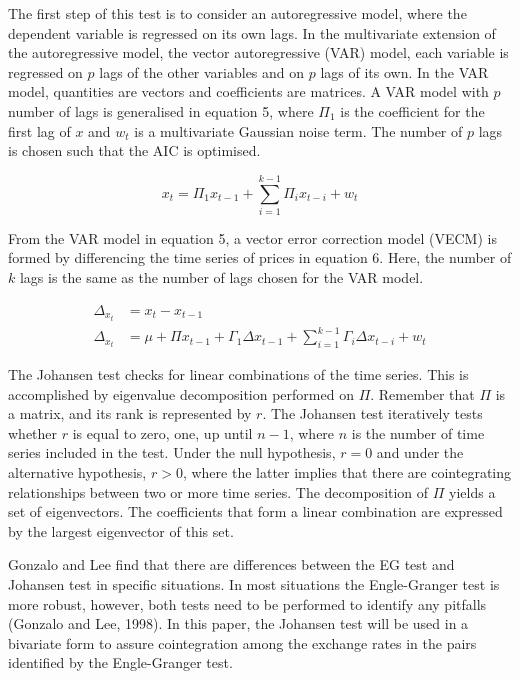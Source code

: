 \documentclass[12pt,english,authoryear]{article}
\begin{document}
The first step of this test is to consider an autoregressive model, where the dependent variable is regressed on its own lags. In the multivariate extension of the autoregressive model, the vector autoregressive (VAR) model, each variable is regressed on $p$ lags of the other variables and on $p$ lags of its own. In the VAR model, quantities are vectors and coefficients are matrices. A VAR model with $p$ number of lags is generalised in equation 5, where $\Pi_1$ is the coefficient for the first lag of $x$ and $w_t$ is a multivariate Gaussian noise term. The number of $p$ lags is chosen such that the AIC is optimised. 

\begin{equation}
    x_t = \Pi_1x_{t-1} + \sum^{k-1}_{i=1} \Pi_ix_{t-i} + w_t
\end{equation}

From the VAR model in equation 5, a vector error correction model (VECM) is formed by differencing the time series of prices in equation 6. Here, the number of $k$ lags is the same as the number of lags chosen for the VAR model.

\begin{equation}
    \begin{aligned}
        \Delta_{x_t} & = x_{t} - x_{t-1} \\
        \Delta_{x_t} & = \mu +\Pi x_{t-1} + \Gamma_1 \Delta x_{t-1} + \sum^{k-1}_{i=1} \Gamma_i \Delta x_{t-i} + w_t 
    \end{aligned}
\end{equation}

The Johansen test checks for linear combinations of the time series. This is accomplished by eigenvalue decomposition performed on $\Pi$. Remember that $\Pi$ is a matrix, and its rank is represented by $r$. The Johansen test iteratively tests whether $r$ is equal to zero, one, up until $n-1$, where $n$ is the number of time series included in the test. Under the null hypothesis, $r=0$ and under the alternative hypothesis, $r>0$, where the latter implies that there are cointegrating relationships between two or more time series. The decomposition of $\Pi$ yields a set of eigenvectors. The coefficients that form a linear combination are expressed by the largest eigenvector of this set. 

Gonzalo and Lee find that there are differences between the EG test and Johansen test in specific situations. In most situations the Engle-Granger test is more robust, however, both tests need to be performed to identify any pitfalls (Gonzalo and Lee, 1998). In this paper, the Johansen test will be used in a bivariate form to assure cointegration among the exchange rates in the pairs identified by the Engle-Granger test.
\end{document}
